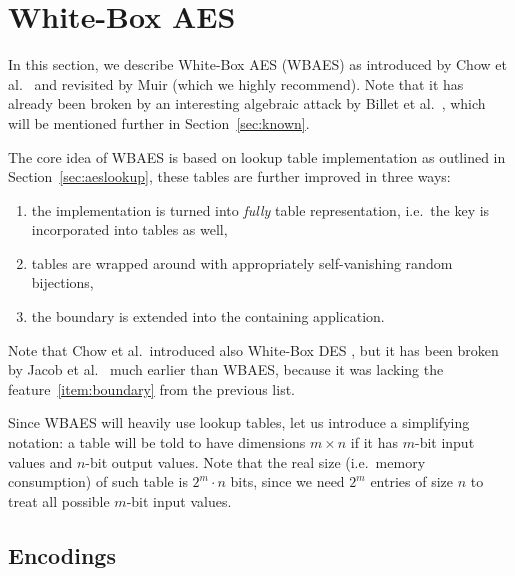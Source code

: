 \section{White-Box AES}
\label{sec:wbaes}

In this section, we describe White-Box AES (WBAES) as introduced by Chow et al.\ \cite{chow2002aes} and revisited by Muir \cite{muir2013tutorial} (which we highly recommend). Note that it has already been broken by an interesting algebraic attack by Billet et al.\ \cite{billet2004cryptanalysis}, which will be mentioned further in Section~\ref{sec:known}.

The core idea of WBAES is based on lookup table implementation as outlined in Section~\ref{sec:aeslookup}, these tables are further improved in three ways:
\begin{enumerate}
	\item the implementation is turned into {\em fully} table representation, i.e.\ the key is incorporated into tables as well,
	\item tables are wrapped around with appropriately self-vanishing random bijections, \label{item:wrap}
	\item the boundary is extended into the containing application. \label{item:boundary}
\end{enumerate}
Note that Chow et al.\ introduced also White-Box DES \cite{chow2002des}, but it has been broken by Jacob et al.\ \cite{jacob2002attacking} much earlier than WBAES, because it was lacking the feature~\ref{item:boundary} from the previous list.

\begin{notation}
\label{notation:table}
	Since WBAES will heavily use lookup tables, let us introduce a simplifying notation: a table will be told to have dimensions $m\times n$ if it has $m$-bit input values and $n$-bit output values. Note that the real size (i.e.\ memory consumption) of such table is $2^m\cdot n$ bits, since we need $2^m$ entries of size $n$ to treat all possible $m$-bit input values.
\end{notation}



\subsection{Encodings}
\label{sec:encod}

